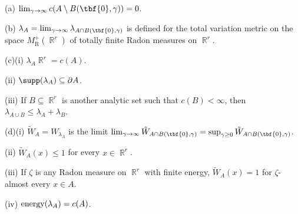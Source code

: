 (a) $\lim_{\gamma\to\infty}c(A\setminus B(\tbf{0},\gamma))=0$.

(b) $\lambda_A=\lim_{\gamma\to\infty}\lambda_{A\cap B(\tbf{0},\gamma)}$
is defined for the total variation metric on the space
$M^+_{\text{R}}(\BbbR^r)$ of totally finite Radon measures on $\BbbR^r$.

(c)(i) $\lambda_A\BbbR^r=c(A)$.

\quad(ii) $\supp(\lambda_A)\subseteq\partial A$.

\quad(iii) If $B\subseteq\BbbR^r$ is another analytic set such that
$c(B)<\infty$, then $\lambda_{A\cup B}\le\lambda_A+\lambda_B$.

(d)(i) $\tilde W_A=W_{\lambda_A}$ is the limit
$\lim_{\gamma\to\infty}\tilde W_{A\cap B(\tbf{0},\gamma)}
=\sup_{\gamma\ge 0}\tilde W_{A\cap B(\tbf{0},\gamma)}$.

\quad(ii) $\tilde W_A(x)\le 1$ for every $x\in\BbbR^r$.

\quad(iii) If $\zeta$ is any Radon measure on $\BbbR^r$ with finite energy,
$\tilde W_A(x)=1$ for $\zeta$-almost every $x\in A$.

\quad(iv) $\mathop{\text{energy}}\nolimits(\lambda_A)=c(A)$.

